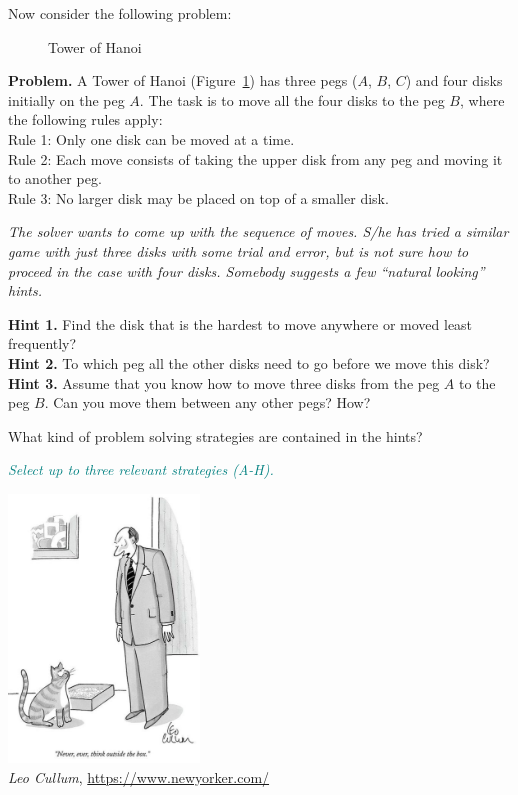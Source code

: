\documentclass[jou]{apa6}
\begin{document}
Now consider the following problem:

\begin{figure}[!htb]
\caption{\label{fig:tower-of-hanoi} Tower of Hanoi}
\end{figure}

\begin{mdframed}[roundcorner=6pt]
{\footnotesize
{\bf Problem.} A Tower of Hanoi (Figure~\ref{fig:tower-of-hanoi}) 
has three pegs ($A$, $B$, $C$) and
four disks initially on the peg $A$. The task is to move all the four disks to the peg $B$, where
the following rules apply:\\
Rule 1: Only one disk can be moved at a time.\\
Rule 2: Each move consists of taking the upper disk from any peg and moving it to 
another peg.\\
Rule 3: No larger disk may be placed on top of a smaller disk.

{\em The solver wants to come up with the sequence of moves. S/he has tried
a similar game with just three disks with some trial and error, but 
is not sure how to proceed in the case with four disks. Somebody suggests 
a few ``natural looking'' hints.}

{\bf Hint 1.} Find the disk that is the hardest to move anywhere or moved least frequently?\\
{\bf Hint 2.} To which peg all the other disks need to go before we move this disk?\\
{\bf Hint 3.} Assume that you know how to move three disks from the peg $A$ to the peg $B$. 
Can you move them between any other pegs? How?
}
\end{mdframed}


What kind of problem solving strategies are contained in the hints?

\textcolor{teal}{\em Select up to three relevant strategies (A-H).}



\begin{center}
\includegraphics[width=2in]{thinking-outside-the-box.png}\\
\textcopyright{} {\em Leo Cullum}, \url{https://www.newyorker.com/}
\end{center}
\end{document}
